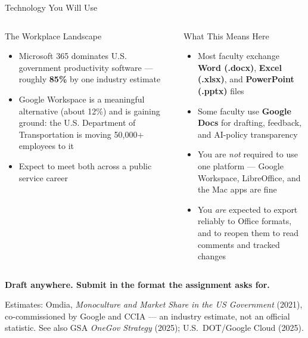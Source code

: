 \documentclass[10pt,aspectratio=169]{beamer}
\begin{document}
\begin{frame}{Technology You Will Use}
\footnotesize
\begin{columns}[T,onlytextwidth]
  \begin{block}{The Workplace Landscape}
    \begin{itemize}\setlength{\itemsep}{3pt}
      \item Microsoft 365 dominates U.S. government productivity software --- roughly \textbf{85\%} by one industry estimate
      \item Google Workspace is a meaningful alternative (about 12\%) and is gaining ground: the U.S. Department of Transportation is moving 50,000+ employees to it
      \item Expect to meet both across a public service career
    \end{itemize}
  \end{block}

  \begin{block}{What This Means Here}
    \begin{itemize}\setlength{\itemsep}{3pt}
      \item Most faculty exchange \textbf{Word (.docx)}, \textbf{Excel (.xlsx)}, and \textbf{PowerPoint (.pptx)} files
      \item Some faculty use \textbf{Google Docs} for drafting, feedback, and AI-policy transparency
      \item You are \emph{not} required to use one platform --- Google Workspace, LibreOffice, and the Mac apps are fine
      \item You \emph{are} expected to export reliably to Office formats, and to reopen them to read comments and tracked changes
    \end{itemize}
  \end{block}
\end{columns}

\vspace{0.15em}
{\centering\alert{\textbf{Draft anywhere. Submit in the format the assignment asks for.}}\par}

\vspace{0.15em}
\begin{minipage}{0.8\textwidth}
  {\tiny\raggedright Estimates: Omdia, \emph{Monoculture and Market Share in the US Government} (2021), co-commissioned by Google and CCIA --- an industry estimate, not an official statistic. See also GSA \emph{OneGov Strategy} (2025); U.S.\ DOT/Google Cloud (2025).\par}
\end{minipage}
\end{frame}
\end{document}
